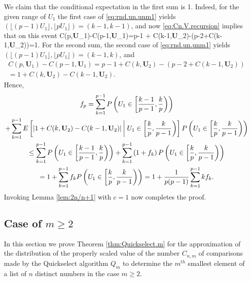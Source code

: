 \documentclass[12pt]{article}
\begin{document}
We claim that the conditional expectation in the first sum is 1. Indeed, for the given range of $U_1$ the first case of \eqref{eq:rnd.un.unm1} yields $(\lfloor (p-1)U_1 \rfloor,\lfloor pU_1\rfloor)=(k-1,k-1)$, and now 
\eqref{eq:Cn.V.recursion} implies that on this event
\beas
C(p,\textbf{U}_1)-C(p-1,\textbf{U}_1)=p-1 + C(k-1,\textbf{U}_2)-(p-2+C(k-1,\textbf{U}_2))=1.
\enas
For the second sum, the second case of \eqref{eq:rnd.un.unm1} yields $(\lfloor (p-1)U_1 \rfloor,\lfloor pU_1\rfloor)=(k-1,k)$, and
\begin{multline*}
C(p,\textbf{U}_1)-C(p-1,\textbf{U}_1)=p-1 + C(k,\textbf{U}_2)-(p-2+C(k-1,\textbf{U}_2))\\
=1+C(k,\textbf{U}_2)-C(k-1,\textbf{U}_2).
\end{multline*}
Hence, 
\begin{multline*}
f_p = \sum_{k=1}^{p-1}P\left(U_1 \in \left[ \frac{k-1}{p-1},\frac{k}{p}\right)\right)\\
+\sum_{k=1}^{p-1}E\left[ |1+C(k,\textbf{U}_2)-C(k-1,\textbf{U}_2)| \Bvert U_1 \in \left[ \frac{k}{p},\frac{k}{p-1}\right)\right]P\left(U_1 \in \left[ \frac{k}{p},\frac{k}{p-1}\right)\right)\\
\le \sum_{k=1}^{p-1}P\left(U_1 \in \left[ \frac{k-1}{p-1},\frac{k}{p}\right)\right)+\sum_{k=1}^{p-1}\left(1+f_k\right)P\left(U_1 \in \left[ \frac{k}{p},\frac{k}{p-1}\right)\right)\\
= 1 +  \sum_{k=1}^{p-1}f_k P\left(U_1 \in \left[ \frac{k}{p},\frac{k}{p-1}\right)\right)= 1 +  \frac{1}{p(p-1)}\sum_{k=1}^{p-1}kf_k. %
\end{multline*}
Invoking Lemma \ref{lem:2n/n+1} with $c=1$ now completes the proof. \bbox




\subsection{Case of $m \ge 2$} %
In this section we prove Theorem \ref{thm:Quickselect.m} for the approximation of the distribution of the properly scaled value of the number $C_{n,m}$ of comparisons made by the Quickselect algorithm $Q_m$ to determine the $m^{th}$ smallest element of a list of $n$ distinct numbers in the case $m \ge 2$.
\end{document}
